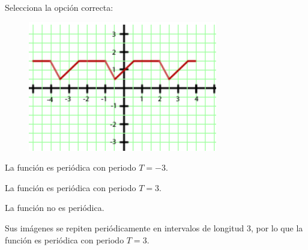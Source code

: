 \begin{scq}
	Selecciona la opción correcta:\\
	\begin{figure}
		\includegraphics{samples/propiedades/periodicidad5.jpg}
	\end{figure}
	\begin{choices}
		\begin{choice}
			La función es periódica con periodo $T=-3$.	
		\end{choice}
		\begin{choice}[x]
			La función es periódica con periodo $T=3$.
		\end{choice}	
		\begin{choice}
			La función no es periódica.
		\end{choice}
	\end{choices}
	\begin{feedback}
		Sus imágenes se repiten periódicamente en intervalos de longitud 3, por lo que la función es periódica con periodo $T=3$.
	\end{feedback}
\end{scq}
